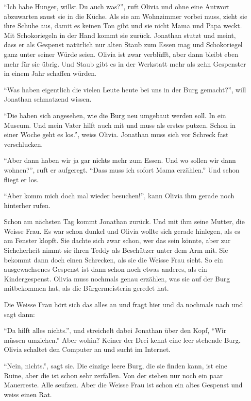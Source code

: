 \enquote{Ich habe Hunger, willst Du auch was?}, ruft Olivia und ohne eine
Antwort abzuwarten saust sie in die Küche. Als sie am Wohnzimmer vorbei muss,
zieht sie ihre Schuhe aus, damit es keinen Ton gibt und sie nicht Mama und Papa
weckt. Mit Schokoriegeln in der Hand kommt sie zurück. Jonathan stutzt und meint, dass er als Gespenst natürlich nur alten Staub zum Essen mag und Schokoriegel ganz unter seiner Würde seien. Olivia ist zwar verblüfft, aber dann bleibt eben mehr für sie übrig. Und Staub gibt es in der Werkstatt mehr als zehn Gespenster in einem Jahr schaffen würden.

\enquote{Was haben eigentlich die vielen Leute heute bei uns in der Burg gemacht?}, will Jonathan schmatzend wissen.

\enquote{Die haben sich angesehen, wie die Burg neu umgebaut werden soll. In ein Museum. Und mein Vater hilft auch mit und muss als erstes putzen. Schon in einer Woche geht es los.}, weiss Olivia. Jonathan muss sich vor Schreck fast verschlucken.

\enquote{Aber dann haben wir ja gar nichts mehr zum Essen. Und wo sollen wir dann wohnen?}, ruft er aufgeregt. \enquote{Dass muss ich sofort Mama erzählen.} Und schon fliegt er los.

\enquote{Aber komm mich doch mal wieder besuchen!}, kann Olivia ihm gerade noch hinterher rufen.

Schon am nächsten Tag kommt Jonathan zurück. Und mit ihm seine Mutter, die Weisse Frau. Es war schon dunkel und Olivia wollte sich gerade hinlegen, als es am Fenster klopft. Sie dachte sich zwar schon, wer das sein könnte, aber zur Sicheherheit nimmt sie ihren Teddy als Beschützer unter dem Arm mit. Sie bekommt dann doch einen Schrecken, als sie die Weisse Frau sieht. So ein ausgewachsenes Gespenst ist dann schon noch etwas anderes, als ein Kindergespenst. Olivia muss nochmals genau erzählen, was sie auf der Burg mitbekommen hat, als die Bürgermeisterin geredet hat.

Die Weisse Frau hört sich das alles an und fragt hier und da nochmals nach und sagt dann: 

\enquote{Da hilft alles nichts.}, und streichelt dabei Jonathan über den Kopf, \enquote{Wir müssen umziehen.} Aber wohin? Keiner der Drei kennt eine leer stehende Burg. Olivia schaltet den Computer an und sucht im Internet.

\enquote{Nein, nichts.}, sagt sie. Die einzige leere Burg, die sie finden kann, ist eine Ruine, aber die ist schon sehr zerfallen. Von der stehen nur noch ein paar Mauerreste. Alle seufzen. Aber die Weisse Frau ist schon ein altes Gespenst und weiss einen Rat.



